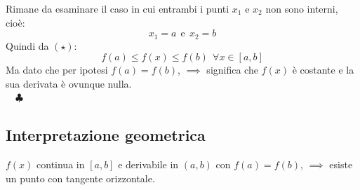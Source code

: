 \documentclass[../../main.tex]{subfiles}
\begin{document}
Rimane da esaminare il caso in cui entrambi i punti $x_1$ e $x_2$ non sono interni, cioè:
\[
    x_1 = a \ \ \text{e} \ \ x_2 = b
\]
Quindi da $(\star)$:
\[
    f(a) \leq f(x) \leq f(b) \ \ \forall x\in[a, b]
\]
Ma dato che per ipotesi $f(a) = f(b)$, $\implies$ significa che $f(x)$ è costante e la sua derivata è ovunque nulla.\\ \ \ $\clubsuit$\\

\subsection{Interpretazione geometrica}
$f(x)$ continua in $[a, b]$ e derivabile in $(a, b)$ con $f(a) = f(b)$, $\implies$ esiste un punto con tangente orizzontale.\\
\end{document}
